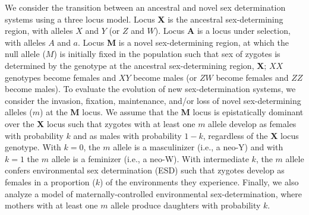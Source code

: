 \documentclass[12pt]{article}
\begin{document}
We consider the transition between an ancestral and novel sex determination systems using a three locus model. 
Locus \textbf{X} is the ancestral sex-determining region, with alleles $X$ and $Y$ (or $Z$ and $W$).
Locus \textbf{A} is a locus under selection, with alleles $A$ and $a$.
Locus \textbf{M} is a novel sex-determining region, at which the null allele ($M$) is initially fixed in the population such that sex of zygotes is determined by the genotype at the ancestral sex-determining region, \textbf{X}; $XX$ genotypes become females and $XY$ become males (or $ZW$ become females and $ZZ$ become males). 
To evaluate the evolution of new sex-determination systems, we consider the invasion, fixation, maintenance, and/or loss of novel sex-determining alleles ($m$) at the \textbf{M} locus. 
We assume that the \textbf{M} locus is epistatically dominant over the \textbf{X} locus such that zygotes with at least one $m$ allele develop as females with probability $k$ and as males with probability $1-k$, regardless of the \textbf{X} locus genotype.
With $k=0$, the $m$ allele is a masculinizer (i.e., a neo-Y) and with $k=1$ the $m$ allele is a feminizer (i.e., a neo-W).
With intermediate $k$, the $m$ allele confers environmental sex determination (ESD) such that zygotes develop as females in a proportion ($k$) of the environments they experience. 
Finally, we also analyze a model of maternally-controlled environmental sex-determination, where mothers with at least one $m$ allele produce daughters with probability $k$. 
\end{document}
